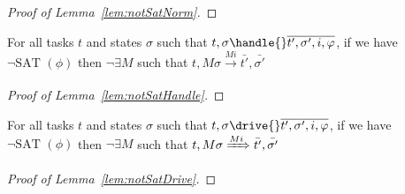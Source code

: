 \begin{proof}[Proof of Lemma~\ref{lem:notSatNorm}]

\end{proof}

\begin{lemma}
  \label{lem:notSatHandle}
  For all tasks $t$ and states $\sigma$ such that $t,\sigma\handle{}\overline{t',\sigma',i,\phi}$, if we have $\neg\text{SAT }(\phi)$ then $\neg\exists M$ such that $t,M\sigma\xrightarrow[]{Mi}\bar{t'},\bar{\sigma'}$

\end{lemma}



\begin{proof}[Proof of Lemma~\ref{lem:notSatHandle}]

\end{proof}

\begin{lemma}
  \label{lem:notSatDrive}
  For all tasks $t$ and states $\sigma$ such that $t,\sigma\drive{}\overline{t',\sigma',i,\phi}$, if we have $\neg\text{SAT }(\phi)$ then $\neg\exists M$ such that $t,M\sigma\xRightarrow[]{Mi}\bar{t'},\bar{\sigma'}$

\end{lemma}

\begin{proof}[Proof of Lemma~\ref{lem:notSatDrive}]

\end{proof}
